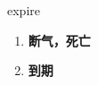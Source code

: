 
\begin{frame}
{\huge expire}
\begin{center}
\begin{enumerate}\Large
  \item \textbf{断气，死亡}
  \item \textbf{到期}
\end{enumerate}
\end{center}
\end{frame}
